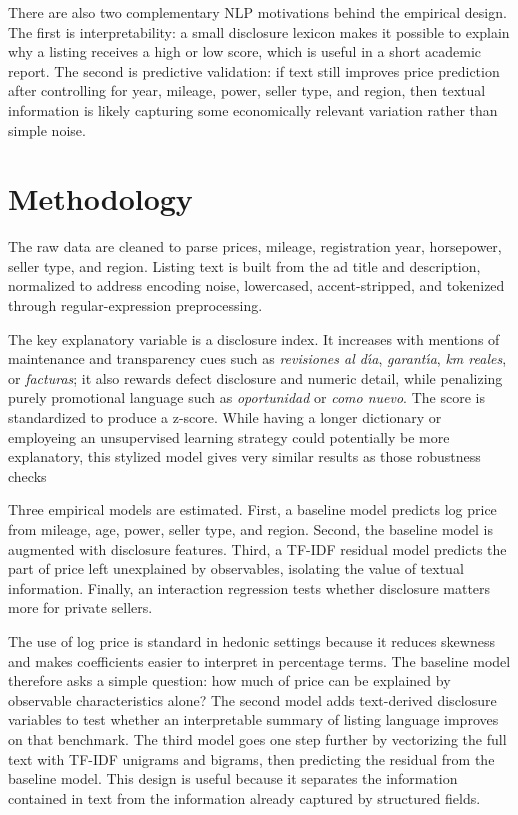 \documentclass[10pt,twocolumn]{article}
\begin{document}
There are also two complementary NLP motivations behind the empirical design. The first is interpretability: a small disclosure lexicon makes it possible to explain why a listing receives a high or low score, which is useful in a short academic report. The second is predictive validation: if text still improves price prediction after controlling for year, mileage, power, seller type, and region, then textual information is likely capturing some economically relevant variation rather than simple noise.

\section{Methodology}
The raw data are cleaned to parse prices, mileage, registration year, horsepower, seller type, and region. Listing text is built from the ad title and description, normalized to address encoding noise, lowercased, accent-stripped, and tokenized through regular-expression preprocessing.

The key explanatory variable is a disclosure index. It increases with mentions of maintenance and transparency cues such as \textit{revisiones al d\'{\i}a}, \textit{garant\'{\i}a}, \textit{km reales}, or \textit{facturas}; it also rewards defect disclosure and numeric detail, while penalizing purely promotional language such as \textit{oportunidad} or \textit{como nuevo}. The score is standardized to produce a z-score. While having a longer dictionary or employeing an unsupervised learning strategy could potentially be more explanatory, this stylized model gives very similar results as those robustness checks

Three empirical models are estimated. First, a baseline model predicts log price from mileage, age, power, seller type, and region. Second, the baseline model is augmented with disclosure features. Third, a TF-IDF residual model predicts the part of price left unexplained by observables, isolating the value of textual information. Finally, an interaction regression tests whether disclosure matters more for private sellers.

The use of log price is standard in hedonic settings because it reduces skewness and makes coefficients easier to interpret in percentage terms. The baseline model therefore asks a simple question: how much of price can be explained by observable characteristics alone? The second model adds text-derived disclosure variables to test whether an interpretable summary of listing language improves on that benchmark. The third model goes one step further by vectorizing the full text with TF-IDF unigrams and bigrams, then predicting the residual from the baseline model. This design is useful because it separates the information contained in text from the information already captured by structured fields.
\end{document}
